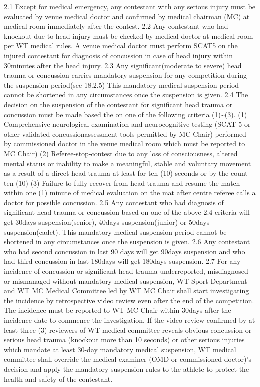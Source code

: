 \documentclass[
]{report}
\begin{document}
2.1 Except for medical emergency, any contestant with any serious injury
must be evaluated by venue medical doctor and confirmed by medical
chairman (MC) at medical room immediately after the contest. 2.2 Any
contestant who had knockout due to head injury must be checked by
medical doctor at medical room per WT medical rules. A venue medical
doctor must perform SCAT5 on the injured contestant for diagnosis of
concussion in case of head injury within 30minutes after the head
injury. 2.3 Any significant(moderate to severe) head trauma or
concussion carries mandatory suspension for any competition during the
suspension period(see 18.2.5) This mandatory medical suspension period
cannot be shortened in any circumstances once the suspension is given.
2.4 The decision on the suspension of the contestant for significant
head trauma or concussion must be made based the on one of the following
criteria (1)\textasciitilde(3). (1) Comprehensive neurological
examination and neurocognitive testing (SCAT 5 or other validated
concussionassessment tools permitted by MC Chair) performed by
commissioned doctor in the venue medical room which must be reported to
MC Chair) (2) Referee-stop-contest due to any loss of consciousness,
altered mental status or inability to make a meaningful, stable and
voluntary movement as a result of a direct head trauma at least for ten
(10) seconds or by the count ten (10) (3) Failure to fully recover from
head trauma and resume the match within one (1) minute of medical
evaluation on the mat after centre referee calls a doctor for possible
concussion. 2.5 Any contestant who had diagnosis of significant head
trauma or concussion based on one of the above 2.4 criteria will get
30days suspension(senior), 40days suspension(junior) or 50days
suspension(cadet). This mandatory medical suspension period cannot be
shortened in any circumstances once the suspension is given. 2.6 Any
contestant who had second concussion in last 90 days will get 90days
suspension and who had third concussion in last 180days will get 180days
suspension. 2.7 For any incidence of concussion or significant head
trauma underreported, misdiagnosed or mismanaged without mandatory
medical suspension, WT Sport Department and WT MC Medical Committee led
by WT MC Chair shall start investigating the incidence by retrospective
video review even after the end of the competition. The incidence must
be reported to WT MC Chair within 30days after the incidence date to
commence the investigation. If the video review confirmed by at least
three (3) reviewers of WT medical committee reveals obvious concussion
or serious head trauma (knockout more than 10 seconds) or other serious
injuries which mandate at least 30-day mandatory medical suspension, WT
medical committee shall override the medical examiner (OMD or
commissioned doctor)'s decision and apply the mandatory suspension rules
to the athlete to protect the health and safety of the contestant.
\end{document}

